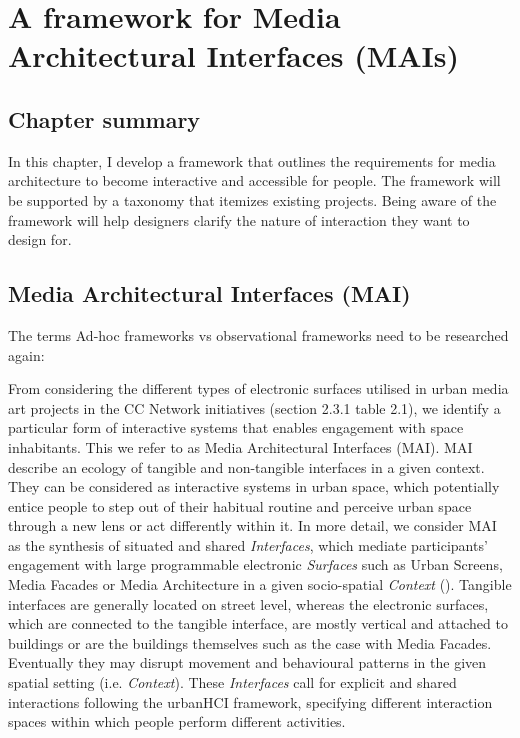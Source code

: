 \chapter{A framework for Media Architectural Interfaces (MAIs)}
\label{chapterlabel4}

\section*{Chapter summary}

In this chapter, I develop a framework that outlines the requirements for media architecture to become interactive and accessible for people. The framework will be supported by a taxonomy that itemizes existing projects. Being aware of the framework will help designers clarify the nature of interaction they want to design for.  

\newpage


\section{ Media Architectural Interfaces (MAI) }

The terms Ad-hoc frameworks vs observational frameworks need to be researched again:

From considering the different types of electronic surfaces utilised in urban media art projects in the CC Network initiatives (section 2.3.1 table 2.1), we identify a particular form of interactive systems that enables engagement with space inhabitants. 
This we refer to as Media Architectural Interfaces (MAI).
MAI describe an ecology of tangible and non-tangible interfaces in a given context. 
They can be considered as interactive systems in urban space, which potentially entice people to step out of their habitual routine and perceive urban space through a new lens or act differently within it. 
In more detail, we consider MAI as the synthesis of situated and shared \textit{Interfaces}, which mediate participants’ engagement with large programmable electronic \textit{Surfaces} such as Urban Screens, Media Facades or Media Architecture in a given socio-spatial \textit{Context} (\label{fig:MAI_Framework}). 
Tangible interfaces are generally located on street level, whereas the electronic surfaces, which are connected to the tangible interface, are mostly vertical and attached to buildings or are the buildings themselves such as the case with Media Facades. 
Eventually they may disrupt movement and behavioural patterns in the given spatial setting (i.e. \textit{Context}). 
These \textit{Interfaces} call for explicit and shared interactions following the urbanHCI framework, specifying different interaction spaces within which people perform different activities.

